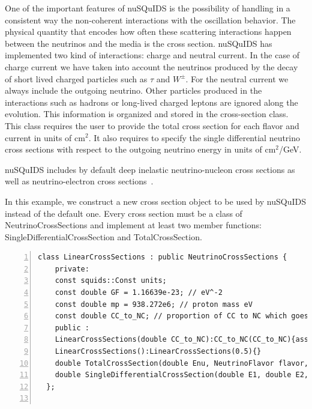 \documentclass[3p,12pt]{elsarticle}
\newcommand{\ttf}{\ttfamily}
\begin{document}
One of the important features of nuSQuIDS is the possibility of handling in a
consistent way the non-coherent interactions with the oscillation
behavior. The physical quantity that encodes how often these scattering
interactions happen between the neutrinos and the media is the cross
section.
nuSQuIDS has implemented two kind of interactions: charge and
neutral current. In the case of charge current we have taken into account
the neutrinos produced by the decay of short lived charged particles
such as $\tau$ and $W^\pm$. For the neutral current we always include
the outgoing neutrino.
Other particles produced in the interactions such as hadrons or long-lived
charged leptons are ignored along the evolution.
This information is organized and stored in the cross-section class.
This class requires the user to provide the total cross section for
each flavor and current in units of cm$^2$. It also requires to
specify the single differential neutrino cross sections with respect to
the outgoing neutrino energy in units of cm$^2$/GeV.

nuSQuIDS includes by default deep inelastic neutrino-nucleon
cross sections as well as neutrino-electron
cross sections~\citep{Gandhi:1998ri, CooperSarkar:2011pa}.

In this example, we construct a new cross section object to be used by
nuSQuIDS instead of the default one.
Every cross section must be a class of {\ttf NeutrinoCrossSections}
and implement at least two member functions:
{\ttf SingleDifferentialCrossSection} and {\ttf TotalCrossSection}.


\begin{lstlisting}[frame=leftline, numbers =
  left,breaklines=true,label = ex:sin1]
  class LinearCrossSections : public NeutrinoCrossSections {
    private:
    const squids::Const units;
    const double GF = 1.16639e-23; // eV^-2
    const double mp = 938.272e6; // proton mass eV
    const double CC_to_NC; // proportion of CC to NC which goes from 0 to 1.
    public :
    LinearCrossSections(double CC_to_NC):CC_to_NC(CC_to_NC){assert( CC_to_NC <= 1.0  && CC_to_NC >= 0.0 );}
    LinearCrossSections():LinearCrossSections(0.5){}
    double TotalCrossSection(double Enu, NeutrinoFlavor flavor, NeutrinoType neutype, Current current) const override;
    double SingleDifferentialCrossSection(double E1, double E2, NeutrinoFlavor flavor, NeutrinoType neutype, Current current) const override;
  };  
 
\end{lstlisting}
\end{document}
